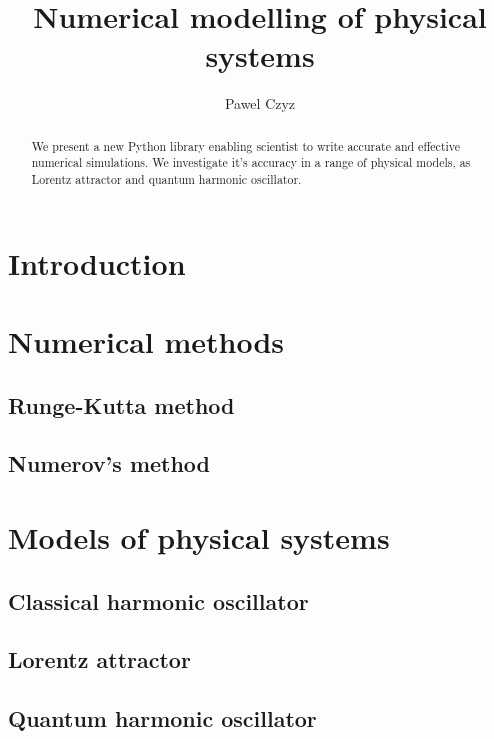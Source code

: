 \documentclass{llncs}
\begin{document}
\title{Numerical modelling of physical systems}
\author{ Pawel Czyz }



\maketitle

\begin{abstract}
We present a new Python library enabling scientist to write accurate and effective numerical simulations. We investigate it's accuracy in a range of physical
models, as Lorentz attractor and quantum harmonic oscillator.

\end{abstract}

\section{Introduction}

\section{Numerical methods}
\subsection{Runge-Kutta method}
\subsection{Numerov's method}

\section{Models of physical systems}
\subsection{Classical harmonic oscillator}
\subsection{Lorentz attractor}
\subsection{Quantum harmonic oscillator}
\end{document}
